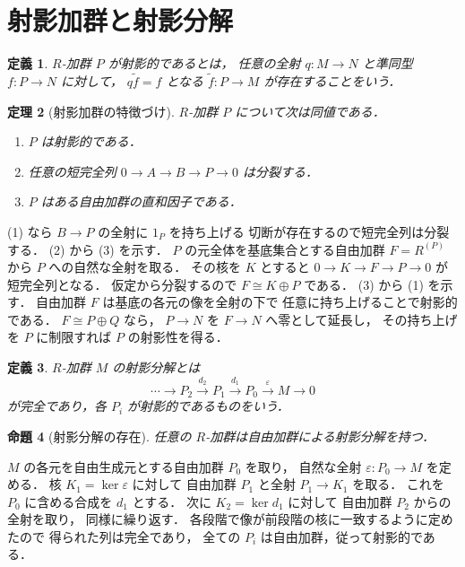 \documentclass[a5paper,10pt,onecolumn]{jsarticle}
\makeatletter
\theoremstyle{mathnotetheorem}
\newtheorem{theorem}{定理}[section]
\newtheorem{definition}[theorem]{定義}
\newtheorem{proposition}[theorem]{命題}
\renewcommand{\proofname}{証明}
\renewenvironment{proof}[1][\proofname]{%
  \par\pushQED{\qed}\normalfont\topsep4\p@\@plus2\p@\relax
  \trivlist\item[\hskip\labelsep\bfseries #1]\ignorespaces
}{\popQED\endtrivlist\@endpefalse}
\makeatother
\begin{document}
\section{射影加群と射影分解}

\begin{definition}
$R$-加群 $P$ が射影的であるとは，
任意の全射 $q:M\to N$ と準同型 $f:P\to N$ に対して，
$q\widetilde f=f$ となる
$\widetilde f:P\to M$ が存在することをいう．
\end{definition}

\begin{theorem}[射影加群の特徴づけ]\label{thm:projective}
$R$-加群 $P$ について次は同値である．
\begin{enumerate}
\item $P$ は射影的である．
\item 任意の短完全列 $0\to A\to B\to P\to0$ は分裂する．
\item $P$ はある自由加群の直和因子である．
\end{enumerate}
\end{theorem}
\begin{proof}
(1) なら $B\to P$ の全射に $1_P$ を持ち上げる
切断が存在するので短完全列は分裂する．
(2) から (3) を示す．
$P$ の元全体を基底集合とする自由加群
$F=R^{(P)}$ から $P$ への自然な全射を取る．
その核を $K$ とすると
$0\to K\to F\to P\to0$ が短完全列となる．
仮定から分裂するので $F\cong K\oplus P$ である．
(3) から (1) を示す．
自由加群 $F$ は基底の各元の像を全射の下で
任意に持ち上げることで射影的である．
$F\cong P\oplus Q$ なら，
$P\to N$ を $F\to N$ へ零として延長し，
その持ち上げを $P$ に制限すれば
$P$ の射影性を得る．
\end{proof}

\begin{definition}
$R$-加群 $M$ の射影分解とは
\[
 \cdots\to P_2\xrightarrow{d_2}P_1
 \xrightarrow{d_1}P_0\xrightarrow{\varepsilon}M\to0
\]
が完全であり，各 $P_i$ が射影的であるものをいう．
\end{definition}

\begin{proposition}[射影分解の存在]\label{prop:resolution}
任意の $R$-加群は自由加群による射影分解を持つ．
\end{proposition}
\begin{proof}
$M$ の各元を自由生成元とする自由加群 $P_0$ を取り，
自然な全射 $\varepsilon:P_0\to M$ を定める．
核 $K_1=\ker\varepsilon$ に対して
自由加群 $P_1$ と全射 $P_1\to K_1$ を取る．
これを $P_0$ に含める合成を $d_1$ とする．
次に $K_2=\ker d_1$ に対して
自由加群 $P_2$ からの全射を取り，
同様に繰り返す．
各段階で像が前段階の核に一致するように定めたので
得られた列は完全であり，
全ての $P_i$ は自由加群，従って射影的である．
\end{proof}
\end{document}
